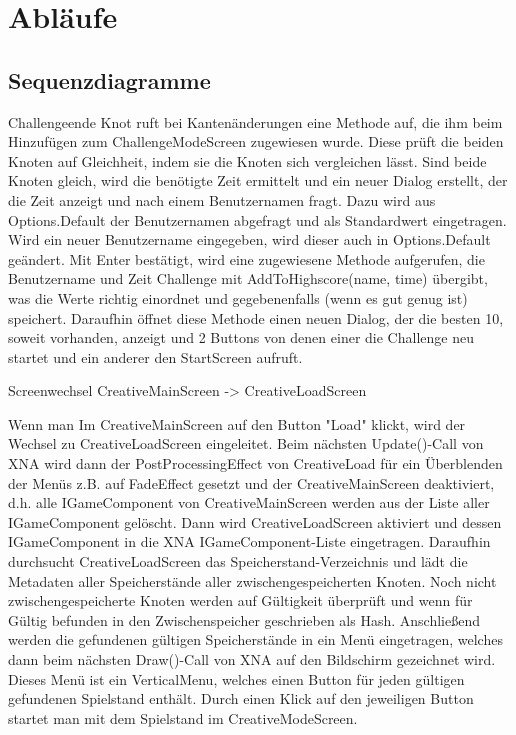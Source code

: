 \chapter{Abläufe}

\section{Sequenzdiagramme}
Challengeende
Knot ruft bei Kantenänderungen eine Methode auf, die ihm beim Hinzufügen zum ChallengeModeScreen zugewiesen wurde.
Diese prüft die beiden Knoten auf Gleichheit, indem sie die Knoten sich vergleichen lässt.
Sind beide Knoten gleich, wird die benötigte Zeit ermittelt und ein neuer Dialog erstellt, der die Zeit anzeigt und nach einem Benutzernamen fragt.
Dazu wird aus Options.Default der Benutzernamen abgefragt und als Standardwert eingetragen.
Wird ein neuer Benutzername eingegeben, wird dieser auch in Options.Default geändert.
Mit Enter bestätigt, wird eine zugewiesene Methode aufgerufen, die Benutzername und Zeit Challenge mit AddToHighscore(name, time) 
übergibt, was die Werte richtig einordnet und gegebenenfalls (wenn es gut genug ist) speichert.
Daraufhin öffnet diese Methode einen neuen Dialog, der die besten 10, soweit vorhanden, anzeigt und 2 Buttons 
von denen einer die Challenge neu startet und ein anderer den StartScreen aufruft.

Screenwechsel CreativeMainScreen -> CreativeLoadScreen

Wenn man Im CreativeMainScreen auf den Button "Load" klickt, wird der Wechsel zu CreativeLoadScreen eingeleitet.
Beim nächsten Update()-Call von XNA wird dann der PostProcessingEffect von CreativeLoad für ein Überblenden der Menüs z.B. auf FadeEffect gesetzt und der CreativeMainScreen deaktiviert, d.h. alle IGameComponent von CreativeMainScreen 
werden aus der Liste aller IGameComponent gelöscht. Dann wird CreativeLoadScreen aktiviert und dessen IGameComponent in die XNA IGameComponent-Liste eingetragen. 
Daraufhin durchsucht CreativeLoadScreen das Speicherstand-Verzeichnis und lädt die Metadaten aller Speicherstände aller zwischengespeicherten Knoten. 
Noch nicht zwischengespeicherte Knoten werden auf Gültigkeit überprüft und wenn für Gültig befunden in den Zwischenspeicher geschrieben als Hash.
Anschließend werden die gefundenen gültigen Speicherstände in ein Menü eingetragen, welches dann beim nächsten Draw()-Call von XNA auf den Bildschirm gezeichnet wird.
Dieses Menü ist ein VerticalMenu, welches einen Button für jeden gültigen gefundenen Spielstand enthält. Durch einen Klick auf den jeweiligen Button 
startet man mit dem Spielstand im CreativeModeScreen.
